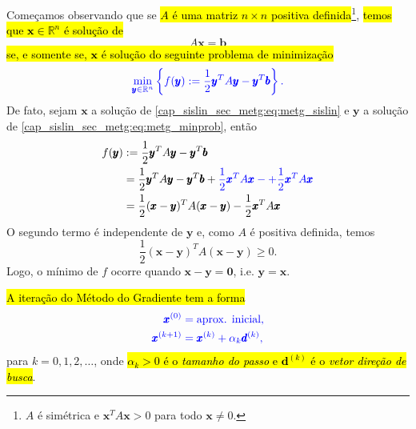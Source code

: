 Começamos observando que se \hl{$A$ é uma matriz $n\times n$ positiva definida}\footnote{$A$ é simétrica e $\pmb{x}^TA\pmb{x} > 0$ para todo $\pmb{x}\neq 0$.}, \hl{temos que $\pmb{x}\in\mathbb{R}^n$ é solução de}
\begin{equation}\label{cap_sislin_sec_metg:eq:metg_sislin}
  A\pmb{x} = \pmb{b}
\end{equation}
\hl{se, e somente se, $\pmb{x}$ é solução do seguinte problema de minimização}
\begin{equation}\label{cap_sislin_sec_metg:eq:metg_minprob}\color{blue}\min_{\pmb{y}\in\mathbb{R}^n}\left\{f(\pmb{y}) := \frac{1}{2}\pmb{y}^TA\pmb{y}-\pmb{y}^T\pmb{b}\right\}.
\end{equation}
De fato, sejam $\pmb{x}$ a solução de \eqref{cap_sislin_sec_metg:eq:metg_sislin} e $\pmb{y}$ a solução de \eqref{cap_sislin_sec_metg:eq:metg_minprob}, então
\begin{align}
  f(\pmb{y}) &:= \frac{1}{2}\pmb{y}^TA\pmb{y}-\pmb{y}^T\pmb{b}\\
             &= \frac{1}{2}\pmb{y}^TA\pmb{y}-\pmb{y}^T\pmb{b} + {\color{blue}\frac{1}{2}\pmb{x}^TA\pmb{x} - + \frac{1}{2}\pmb{x}^TA\pmb{x}}\\
             &= \frac{1}{2}(\pmb{x}-\pmb{y})^TA(\pmb{x}-\pmb{y}) - \frac{1}{2}\pmb{x}^TA\pmb{x}
\end{align}
O segundo termo é independente de $\pmb{y}$ e, como $A$ é positiva definida, temos
\begin{equation}
  \frac{1}{2}(\pmb{x}-\pmb{y})^TA(\pmb{x}-\pmb{y}) \geq 0.
\end{equation}
Logo, o mínimo de $f$ ocorre quando $\pmb{x}-\pmb{y} = \pmb{0}$, i.e. $\pmb{y} = \pmb{x}$.

\hl{A iteração do Método do Gradiente tem a forma}
\begin{equation}\color{blue}\begin{aligned}
    \pmb{x}^{(0)} &= \text{aprox. inicial},\\
    \pmb{x}^{(k+1)} &= \pmb{x}^{(k)} + \alpha_k\pmb{d}^{(k)},
  \end{aligned}
\end{equation}
para $k=0, 1, 2, \ldots$, onde \hl{$\alpha_k>0$ é o \emph{tamanho do passo} e $\pmb{d}^{(k)}$ é o \emph{vetor direção de busca}}.

